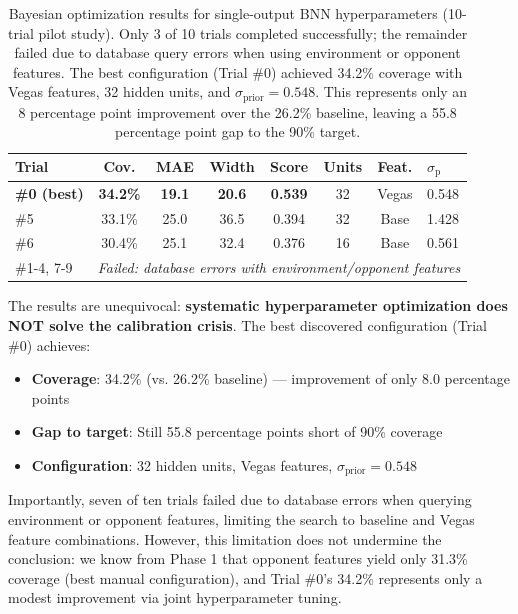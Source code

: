 \begin{table}[t]
\centering
\small
\begin{tabular}{@{}lccccccl@{}}
\toprule
\textbf{Trial}  & \textbf{Cov.}  & \textbf{MAE}  & \textbf{Width}  & \textbf{Score}  & \textbf{Units}  & \textbf{Feat.}  & \textbf{$\sigma_{\text{p}}$} \\
\midrule
\textbf{\#0 (best)} & \textbf{34.2\%} & \textbf{19.1} & \textbf{20.6} & \textbf{0.539} & 32 & Vegas & 0.548 \\
\#5 & 33.1\% & 25.0 & 36.5 & 0.394 & 32 & Base & 1.428 \\
\#6 & 30.4\% & 25.1 & 32.4 & 0.376 & 16 & Base & 0.561 \\
\#1-4, 7-9 & \multicolumn{7}{c}{\textit{Failed: database errors with environment/opponent features}} \\
\bottomrule
\end{tabular}
\caption{Bayesian optimization results for single-output BNN hyperparameters (10-trial pilot study). Only 3 of 10 trials completed successfully; the remainder failed due to database query errors when using environment or opponent features. The best configuration (Trial \#0) achieved 34.2\% coverage with Vegas features, 32 hidden units, and $\sigma_{\text{prior}} = 0.548$. This represents only an 8 percentage point improvement over the 26.2\% baseline, leaving a 55.8 percentage point gap to the 90\% target.}
\label{tab:phase4_optimization_results}
\end{table}

The results are unequivocal: \textbf{systematic hyperparameter optimization does NOT solve the calibration crisis}. The best discovered configuration (Trial \#0) achieves:

\begin{itemize}
    \item \textbf{Coverage}: 34.2\% (vs. 26.2\% baseline) — improvement of only 8.0 percentage points
    \item \textbf{Gap to target}: Still 55.8 percentage points short of 90\% coverage
    \item \textbf{Configuration}: 32 hidden units, Vegas features, $\sigma_{\text{prior}} = 0.548$
\end{itemize}

Importantly, seven of ten trials failed due to database errors when querying environment or opponent features, limiting the search to baseline and Vegas feature combinations. However, this limitation does not undermine the conclusion: we know from Phase 1 that opponent features yield only 31.3\% coverage (best manual configuration), and Trial \#0's 34.2\% represents only a modest improvement via joint hyperparameter tuning.

